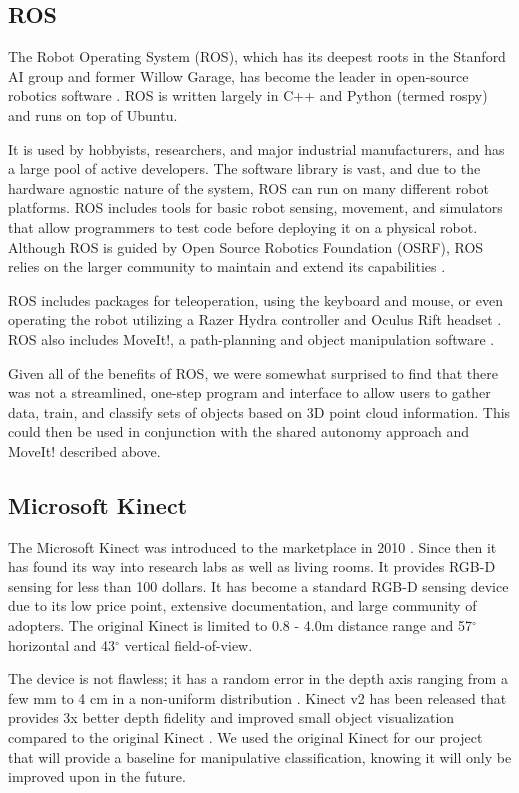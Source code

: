 \documentclass{article}
\begin{document}
\subsection{ROS}
The Robot Operating System (ROS), which has its deepest roots in the Stanford AI group and former Willow Garage, 
has become the leader in open-source robotics software \cite{ros, rospaper}. ROS is written largely in C++ and Python (termed rospy) and runs on top of Ubuntu.  

It is used by hobbyists, researchers, and major industrial manufacturers, and has a large pool of active developers. The software library is vast, and due to the hardware agnostic nature of the system, ROS can run on many different robot platforms.  ROS includes tools for basic robot sensing, movement, and simulators that allow programmers to test code before deploying it on a physical robot. Although ROS is guided by Open Source Robotics Foundation (OSRF), ROS relies on the larger community to maintain and extend its capabilities \cite{ros, OSRF}.

ROS includes packages for teleoperation, using the keyboard and mouse, or even operating the robot utilizing a Razer Hydra controller and Oculus Rift headset \cite{surrogate}. ROS also includes MoveIt!, a path-planning and object manipulation software \cite{moveit}. 

Given all of the benefits of ROS, we were somewhat surprised to find that there was not a streamlined, one-step program and interface to allow users to gather data, train, and classify sets of objects based on 3D point cloud information.  This could then be used in conjunction with the shared autonomy approach and MoveIt! described above.

\subsection{Microsoft Kinect}
The Microsoft Kinect was introduced to the marketplace in 2010 \cite{kinectHistory}. Since then 
it has found its way into research labs as well as living rooms.
It provides RGB-D sensing for less than 100 dollars. It has become a standard RGB-D
sensing device due to its low price point, extensive documentation, and large community of
adopters. The original Kinect is limited to 0.8 - 4.0m distance range and 57$^{\circ}$ horizontal 
and 43$^{\circ}$ vertical field-of-view. 

The device is not flawless; it has a random error in the depth axis 
ranging from a few mm to 4 cm in a non-uniform distribution \cite{khoshelham2012accuracy,nguyen2012modeling}.
Kinect v2 has been released that provides 3x better depth fidelity and improved small object visualization compared to 
the original Kinect \cite{kinect}. We used the original Kinect for our project that will provide a baseline for manipulative classification, knowing
it will only be improved upon in the future.
\end{document}
